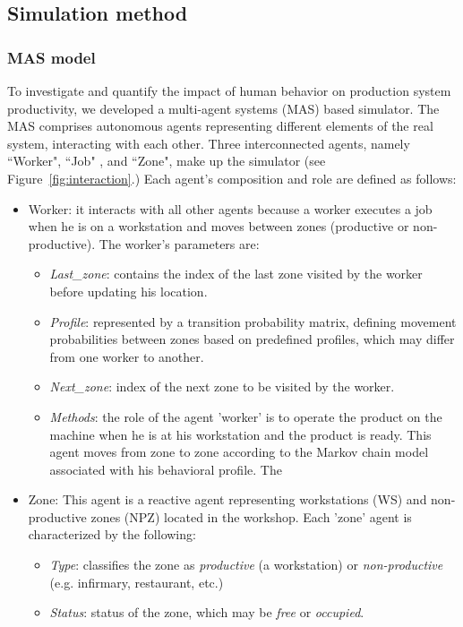 \documentclass[review,12pt, 3p, times]{elsarticle}
\begin{document}
\subsection{Simulation method}\label{sec:res1}
\subsubsection{MAS model}
To investigate and quantify the impact of human behavior on production system productivity, we developed a multi-agent systems (MAS) based simulator. The MAS comprises autonomous agents representing different elements of the real system, interacting with each other. Three interconnected agents, namely “Worker", “Job" , and “Zone", make up the simulator (see Figure~\ref{fig:interaction}.) Each agent's composition and role are defined as follows: 
\begin{itemize}
	\item Worker: it interacts with all other agents because a worker executes a job when he is on a workstation and moves between zones (productive or non-productive). The worker's parameters are:
	      \begin{itemize}
	      	\item \textit{Last\_zone}: contains the index of the last zone visited by the worker before updating his location.
	      	\item \textit{Profile}: represented by a transition probability matrix, defining movement probabilities between zones based on predefined profiles, which may differ from one worker to another.
	      	\item \textit{Next\_zone}: index of the next zone to be visited by the worker.
	      	\item \textit{Methods}: the role of the agent 'worker' is to operate the product on the machine when he is at his workstation and the product is ready. This agent moves from zone to zone according to the Markov chain model associated with his behavioral profile. The 
	      \end{itemize}
	\item Zone: This agent is a reactive agent representing workstations (WS) and non-productive zones (NPZ) located in the workshop.  
	      Each 'zone' agent is characterized by the following:
	      \begin{itemize}
	      	\item\textit{Type}: classifies the zone as \textit{productive} (a workstation) or \textit{non-productive} (e.g. infirmary, restaurant, etc.)
	      	\item\textit{Status}: status of the zone, which may be \textit{free} or \textit{occupied}. 

\end{itemize}
\end{itemize}
\end{document}
